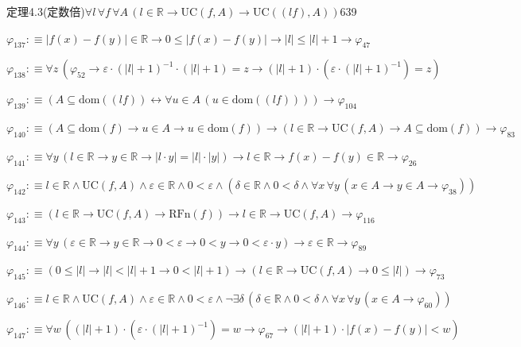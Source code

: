 \begin{fullproof}{定理4.3(定数倍)}{$\forall l\,\forall f\,\forall A\,(l \in \mathbb{R} \to \mathrm{UC}(f,A) \to \mathrm{UC}((l f),A))$}{639}
\begin{abbrevlist}
\item $\varphi_{137} :\equiv \lvert f(x) - f(y) \rvert \in \mathbb{R} \to 0 \leq \lvert f(x) - f(y) \rvert \to \lvert l \rvert \leq \lvert l \rvert + 1 \to \varphi_{47}$
\item $\varphi_{138} :\equiv \forall z\,(\varphi_{52} \to \varepsilon \cdot (\lvert l \rvert + 1)^{-1} \cdot (\lvert l \rvert + 1) = z \to (\lvert l \rvert + 1) \cdot (\varepsilon \cdot (\lvert l \rvert + 1)^{-1}) = z)$
\item $\varphi_{139} :\equiv (A \subseteq \mathrm{dom}((l f)) \leftrightarrow \forall u \in A\,(u \in \mathrm{dom}((l f)))) \to \varphi_{104}$
\item $\varphi_{140} :\equiv (A \subseteq \mathrm{dom}(f) \to u \in A \to u \in \mathrm{dom}(f)) \to (l \in \mathbb{R} \to \mathrm{UC}(f,A) \to A \subseteq \mathrm{dom}(f)) \to \varphi_{83}$
\item $\varphi_{141} :\equiv \forall y\,(l \in \mathbb{R} \to y \in \mathbb{R} \to \lvert l \cdot y \rvert = \lvert l \rvert \cdot \lvert y \rvert) \to l \in \mathbb{R} \to f(x) - f(y) \in \mathbb{R} \to \varphi_{26}$
\item $\varphi_{142} :\equiv l \in \mathbb{R} \land \mathrm{UC}(f,A) \land \varepsilon \in \mathbb{R} \land 0 < \varepsilon \land (\delta \in \mathbb{R} \land 0 < \delta \land \forall x\,\forall y\,(x \in A \to y \in A \to \varphi_{38}))$
\item $\varphi_{143} :\equiv (l \in \mathbb{R} \to \mathrm{UC}(f,A) \to \mathrm{RFn}(f)) \to l \in \mathbb{R} \to \mathrm{UC}(f,A) \to \varphi_{116}$
\item $\varphi_{144} :\equiv \forall y\,(\varepsilon \in \mathbb{R} \to y \in \mathbb{R} \to 0 < \varepsilon \to 0 < y \to 0 < \varepsilon \cdot y) \to \varepsilon \in \mathbb{R} \to \varphi_{89}$
\item $\varphi_{145} :\equiv (0 \leq \lvert l \rvert \to \lvert l \rvert < \lvert l \rvert + 1 \to 0 < \lvert l \rvert + 1) \to (l \in \mathbb{R} \to \mathrm{UC}(f,A) \to 0 \leq \lvert l \rvert) \to \varphi_{73}$
\item $\varphi_{146} :\equiv l \in \mathbb{R} \land \mathrm{UC}(f,A) \land \varepsilon \in \mathbb{R} \land 0 < \varepsilon \land \neg \exists \delta\,(\delta \in \mathbb{R} \land 0 < \delta \land \forall x\,\forall y\,(x \in A \to \varphi_{60}))$
\item $\varphi_{147} :\equiv \forall w\,((\lvert l \rvert + 1) \cdot (\varepsilon \cdot (\lvert l \rvert + 1)^{-1}) = w \to \varphi_{67} \to (\lvert l \rvert + 1) \cdot \lvert f(x) - f(y) \rvert < w)$

\end{abbrevlist}
\end{fullproof}
